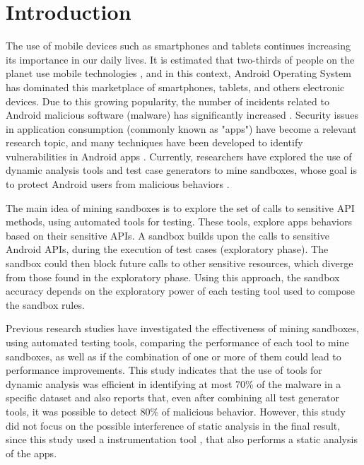 \section{Introduction}

The use of mobile devices such as smartphones and tablets continues increasing its importance in our daily lives. It is estimated that two-thirds of people on the planet use mobile technologies \cite{Comscore}, and in this context, Android Operating System has dominated this marketplace of smartphones, tablets, and others electronic devices. Due to this growing popularity, the number of incidents related to Android malicious software (malware) has significantly increased \cite{faruki2014android,tan2015securing}. Security issues in application consumption (commonly known as "apps") have become a relevant research topic, and many techniques have been developed to identify vulnerabilities in Android apps \cite{tan2015securing}. Currently, researchers have explored the use of dynamic analysis tools and test case generators to mine sandboxes, whose goal is to protect Android users from malicious behaviors \cite{jamrozik2016mining}.

The main idea of mining sandboxes is to explore the set of calls to sensitive API methods, using automated tools for testing. These tools, explore apps behaviors based on their sensitive APIs. A sandbox builds upon the calls to sensitive Android APIs, during the execution of test cases (exploratory phase). The sandbox could then block future calls to other sensitive resources, which diverge from those found in the exploratory phase. Using this approach, the sandbox accuracy depends on the exploratory power of each testing tool used to compose the sandbox rules.

Previous research studies \cite{bao2018mining} have investigated the effectiveness of mining sandboxes, using automated testing tools, comparing the performance of each tool to mine sandboxes, as well as if the combination of one or more of them could lead to performance improvements. This study indicates that the use of tools for dynamic analysis was efficient in identifying at most 70\% of the malware in a specific dataset and also reports that, even after combining all test generator tools, it was possible to detect 80\% of malicious behavior. However, this study did not focus on the possible interference of static analysis in the final result, since this study used a instrumentation tool \cite{cai2017droidfax}, that also performs a static analysis of the apps.

